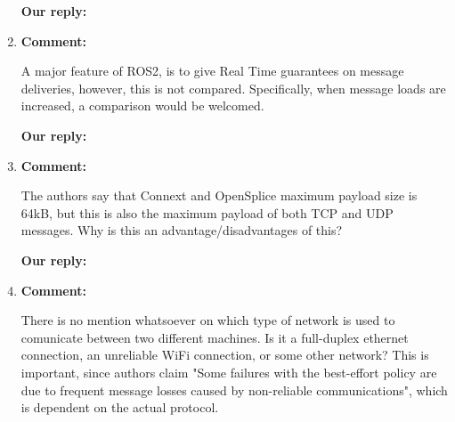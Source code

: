 \documentclass{article}
\begin{document}
\begin{enumerate}
  \begin{flushleft}
    \textbf{Our reply:}
  \end{flushleft}


\item \begin{flushleft}
    \textbf{Comment:}
  \end{flushleft}
  A major feature of ROS2, is to give Real Time guarantees on message deliveries, however, this is not compared. Specifically, when message loads are increased, a comparison would be welcomed.

  \begin{flushleft}
    \textbf{Our reply:}
  \end{flushleft}

\item \begin{flushleft}
    \textbf{Comment:}
  \end{flushleft}
  The authors say that Connext and OpenSplice maximum payload size is 64kB, but this is also the maximum payload of both TCP and UDP messages. Why is this an advantage/disadvantages of this?

  \begin{flushleft}
    \textbf{Our reply:}
  \end{flushleft}


\item \begin{flushleft}
    \textbf{Comment:}
  \end{flushleft}
  There is no mention whatsoever on which type of network is used to comunicate between two different machines. Is it a full-duplex ethernet connection, an unreliable WiFi connection, or some other network?
  This is important, since authors claim "Some failures with the best-effort policy are due to frequent message losses caused by non-reliable communications", which is dependent on the actual protocol.


\end{enumerate}
\end{document}
